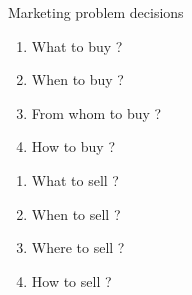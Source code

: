 \documentclass[12pt,ignorenonframetext,aspectratio=169]{beamer}
\providecommand{\tightlist}{%
  \setlength{\itemsep}{0pt}\setlength{\parskip}{0pt}}
\begin{document}
\begin{frame}{Marketing problem decisions}
\protect\hypertarget{marketing-problem-decisions}{}
\begin{block}{}
\protect\hypertarget{section-8}{}
\begin{enumerate}
\tightlist
\item
  What to buy ?
\item
  When to buy ?
\item
  From whom to buy ?
\item
  How to buy ?
\end{enumerate}
\end{block}

\begin{block}{}
\protect\hypertarget{section-9}{}
\begin{enumerate}
\tightlist
\item
  What to sell ?
\item
  When to sell ?
\item
  Where to sell ?
\item
  How to sell ?
\end{enumerate}
\end{block}
\end{frame}
\end{document}
